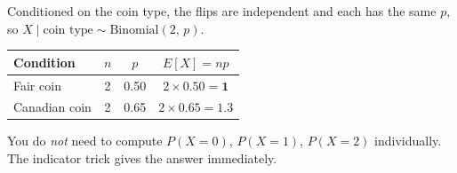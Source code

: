 \documentclass[12pt]{article}
\begin{document}
Conditioned on the coin type, the flips are independent and each has the same $p$, so $X \mid \text{coin type} \sim \mathrm{Binomial}(2,\, p)$.

\begin{center}
\begin{tabular}{lccc}
\toprule
Condition & $n$ & $p$ & $E[X] = np$ \\
\midrule
Fair coin     & 2 & 0.50 & $2 \times 0.50 = \mathbf{1}$ \\
Canadian coin & 2 & 0.65 & $2 \times 0.65 = \mathbf{1.3}$ \\
\bottomrule
\end{tabular}
\end{center}

You do \emph{not} need to compute $P(X=0)$, $P(X=1)$, $P(X=2)$ individually. The indicator trick gives the answer immediately.
\end{document}
